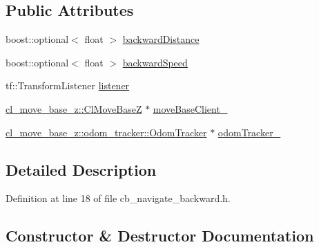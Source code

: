 \subsection*{Public Attributes}
\begin{DoxyCompactItemize}
\item 
boost\+::optional$<$ float $>$ \hyperlink{classcl__move__base__z_1_1CbNavigateBackwards_abb7099e4e18602f6cf06c4f5534a2a15}{backward\+Distance}
\item 
boost\+::optional$<$ float $>$ \hyperlink{classcl__move__base__z_1_1CbNavigateBackwards_aafadf3a154d4f805e63094a46a891764}{backward\+Speed}
\item 
tf\+::\+Transform\+Listener \hyperlink{classcl__move__base__z_1_1CbNavigateBackwards_a86be71ac1dd72f318875bee13259f3da}{listener}
\item 
\hyperlink{classcl__move__base__z_1_1ClMoveBaseZ}{cl\+\_\+move\+\_\+base\+\_\+z\+::\+Cl\+Move\+BaseZ} $\ast$ \hyperlink{classcl__move__base__z_1_1CbNavigateBackwards_a943c1a790eac9266adf11fbdc078f03a}{move\+Base\+Client\+\_\+}
\item 
\hyperlink{classcl__move__base__z_1_1odom__tracker_1_1OdomTracker}{cl\+\_\+move\+\_\+base\+\_\+z\+::odom\+\_\+tracker\+::\+Odom\+Tracker} $\ast$ \hyperlink{classcl__move__base__z_1_1CbNavigateBackwards_a75a8ae7aef6c72e96f4037c4941b0341}{odom\+Tracker\+\_\+}
\end{DoxyCompactItemize}


\subsection{Detailed Description}


Definition at line 18 of file cb\+\_\+navigate\+\_\+backward.\+h.



\subsection{Constructor \& Destructor Documentation}
\mbox{\label{classcl__move__base__z_1_1CbNavigateBackwards_aed93fbbdf28501d068ca4acb6a225d27}} 
